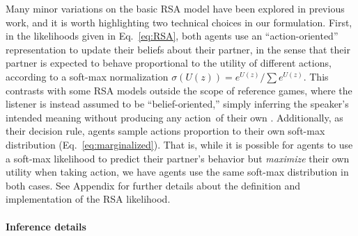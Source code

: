 Many minor variations on the basic RSA model have been explored in previous work, and it is worth highlighting two technical choices in our formulation.
First, in the likelihoods given in Eq.~\ref{eq:RSA}, both agents use an ``action-oriented'' representation to update their beliefs about their partner, in the sense that their partner is expected to behave proportional to the utility of different actions, according to a soft-max normalization $\sigma(U(z)) = e^{U(z)}/\sum e^{U(z)}$.
This contrasts with some RSA models outside the scope of reference games, where the listener is instead assumed to be ``belief-oriented,'' simply inferring the speaker's intended meaning without producing any action of their own \cite{qing2015variations}.
Additionally, as their decision rule, agents sample actions proportion to their own soft-max distribution (Eq.~\ref{eq:marginalized}).
That is, while it is possible for agents to use a soft-max likelihood to predict their partner's behavior but \emph{maximize} their own utility when taking action, we have agents use the same soft-max distribution in both cases.
See Appendix for further details about the definition and implementation of the RSA likelihood.

\paragraph{Inference details}

